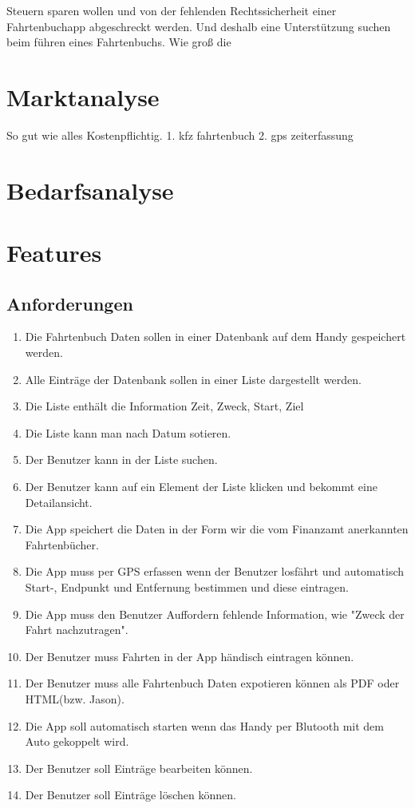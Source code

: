 \documentclass{article}
\begin{document}
Steuern sparen wollen und von der fehlenden Rechtssicherheit einer Fahrtenbuchapp 
abgeschreckt werden. Und deshalb eine Unterstützung suchen beim führen eines Fahrtenbuchs.
Wie groß die 

\section{Marktanalyse}
So gut wie alles Kostenpflichtig.
1. kfz fahrtenbuch
2. gps zeiterfassung

\section{Bedarfsanalyse}

\section{Features}
\subsection{Anforderungen}
	\begin{enumerate}
	\item Die Fahrtenbuch Daten sollen in einer Datenbank auf dem Handy gespeichert werden.
	\item Alle Einträge der Datenbank sollen in einer Liste dargestellt werden.
	\item Die Liste enthält die Information Zeit, Zweck, Start, Ziel
	\item Die Liste kann man nach Datum sotieren.
	\item Der Benutzer kann in der Liste suchen.
	\item Der Benutzer kann auf ein Element der Liste klicken und bekommt eine Detailansicht.
	\item Die App speichert die Daten in der Form wir die vom Finanzamt anerkannten Fahrtenbücher.
	\item Die App muss per GPS erfassen wenn der Benutzer losfährt und automatisch Start-, Endpunkt und Entfernung bestimmen und diese eintragen.
	\item Die App muss den Benutzer Auffordern fehlende Information, wie "Zweck der Fahrt nachzutragen".
	\item Der Benutzer muss Fahrten in der App händisch eintragen können.
	\item Der Benutzer muss alle Fahrtenbuch Daten expotieren können als PDF oder HTML(bzw. Jason).
	\item Die App soll automatisch starten wenn das Handy per Blutooth mit dem Auto gekoppelt wird.
	\item Der Benutzer soll Einträge bearbeiten können.
	\item Der Benutzer soll Einträge löschen können.
	\end{enumerate}
\end{document}
